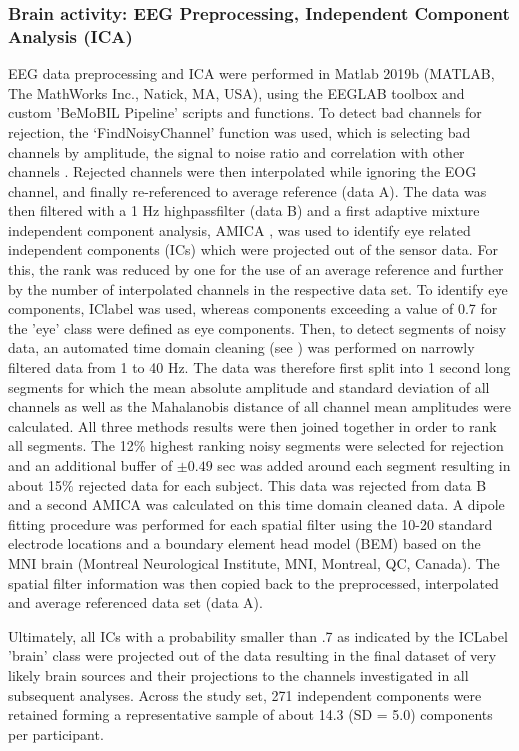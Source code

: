 \subsubsection{Brain activity: EEG Preprocessing, Independent Component Analysis (ICA)}
EEG data preprocessing and ICA were performed in Matlab 2019b (MATLAB, The MathWorks Inc., Natick, MA, USA), using the EEGLAB toolbox \cite{Delorme2004-sn} and custom 'BeMoBIL Pipeline' scripts and functions. To detect bad channels for rejection, the `FindNoisyChannel' function was used, which is selecting bad channels by amplitude, the signal to noise ratio and correlation with other channels \cite{Bigdely-Shamlo2015-ds}. Rejected channels were then interpolated while ignoring the EOG channel, and finally re-referenced to average reference (data A). The data was then filtered with a 1 Hz highpassfilter (data B) and a first adaptive mixture independent component analysis, AMICA \cite{Palmer2011-zs}, was used to identify eye related independent components (ICs) which were projected out of the sensor data. For this, the rank was reduced by one for the use of an average reference and further by the number of interpolated channels in the respective data set. To identify eye components, IClabel \cite{Pion-Tonachini2019-fy} was used, whereas components exceeding a value of 0.7 for the 'eye' class were defined as eye components. Then, to detect segments of noisy data, an automated time domain cleaning (see \cite{Gramann2018-fj}) was performed on narrowly filtered data from 1 to 40 Hz. The data was therefore first split into 1 second long segments for which the mean absolute amplitude and standard deviation of all channels as well as the Mahalanobis distance of all channel mean amplitudes were calculated. All three methods results were then joined together in order to rank all segments. The 12\% highest ranking noisy segments were selected for rejection and an additional buffer of $\pm 0.49$ sec was added around each segment resulting in about 15\% rejected data for each subject. This data was rejected from data B and a second AMICA was calculated on this time domain cleaned data. A dipole fitting procedure was performed for each spatial filter using the 10-20 standard electrode locations and a boundary element head model (BEM) based on the MNI brain (Montreal Neurological Institute, MNI, Montreal, QC, Canada). The spatial filter information was then copied back to the preprocessed, interpolated and average referenced data set (data A). 

Ultimately, all ICs with a probability smaller than .7 as indicated by the ICLabel 'brain' class were projected out of the data resulting in the final dataset of very likely brain sources and their projections to the channels investigated in all subsequent analyses. Across the study set, 271 independent components were retained forming a representative sample of about 14.3 (SD = 5.0) components per participant. 




